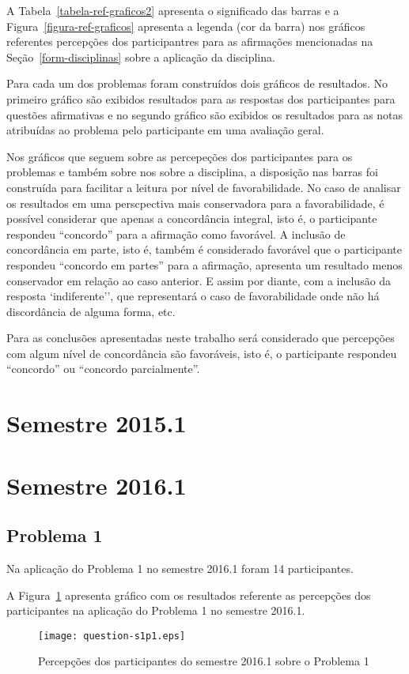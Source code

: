 A Tabela~\ref{tabela-ref-graficos2} apresenta o significado das barras
e a Figura~\ref{figura-ref-graficos} apresenta a legenda (cor da barra)
nos gráficos referentes percepções dos participantres para as
afirmações mencionadas na Seção~\ref{form-disciplinas} sobre
a aplicação da disciplina.

Para cada um dos problemas foram construídos dois gráficos de resultados.
No primeiro gráfico são exibidos resultados para as respostas
dos participantes para questões afirmativas e
no segundo gráfico são exibidos os resultados para as notas atribuídas
ao problema pelo participante em uma avaliação geral.

Nos gráficos que seguem sobre as percepeções dos participantes para os
problemas e também sobre nos sobre a disciplina, a disposição nas barras
foi construída para facilitar a leitura por nível de favorabilidade.
No caso de analisar os resultados em uma perscpectiva mais conservadora
para a favorabilidade, é possível considerar que apenas a concordância
integral, isto é, o participante respondeu ``concordo'' para
a afirmação como favorável.
A inclusão de concordância em parte, isto é, também é considerado favorável que
o participante respondeu ``concordo em partes'' para a afirmação,
apresenta um resultado menos conservador em relação ao caso anterior.
E assim por diante, com a inclusão da resposta `indiferente'', que
representará o caso de favorabilidade onde não há discordância de alguma forma,
etc.

Para as conclusões apresentadas neste trabalho será considerado
que percepções com algum nível de concordância são favoráveis, isto é,
o participante respondeu ``concordo'' ou ``concordo parcialmente''.




\section{Semestre 2015.1}
\label{sec-sem-2015}
\section{Semestre 2016.1}
\label{sec-sem-2016}
\subsection{Problema 1}
Na aplicação do Problema 1 no semestre 2016.1 foram 14 participantes.

A Figura~\ref{percep-s1p1} apresenta gráfico com os resultados referente
as percepções dos participantes na aplicação do
Problema 1 no semestre 2016.1.
\begin{figure}[!htb]
\centering
\texttt{[image: question-s1p1.eps]}
\caption{Percepções dos participantes do semestre 2016.1 sobre o Problema 1}
\label{percep-s1p1}
\end{figure}

